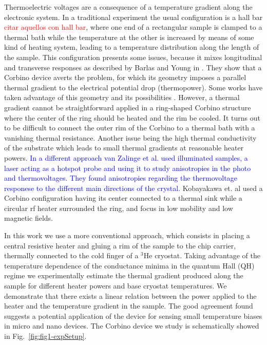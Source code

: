 Thermoelectric voltages are a consequence of a temperature gradient along the electronic system. 
In a traditional experiment the usual configuration is a hall bar \cite{chickering2010thermopower,chickering2013thermoelectric} \textcolor{red}{citar aquellos con hall bar}, where one end of a rectangular sample is clamped to a thermal bath while the temperature at the other is increased by means of some kind of heating system, leading to a temperature distribution along the length of the sample. This configuration presents some issues, because it mixes longitudinal and transverse responses as described by Barlas and Young in \cite{barlas2012thermopower}. They show that a Corbino device averts the problem, for which its geometry imposes a parallel thermal gradient to the electrical potential drop (thermopower). Some works have taken advantage of this geometry and its possibilities \cite{Zalinge2003,kobayakawa2013diffusion,real2020thermoelectricity,mateos2021thermoelectric}. 
However, a thermal gradient cannot be straightforward applied in a ring-shaped Corbino structure where the center of the ring should be heated and the rim be cooled. 
It turns out to be difficult to connect the outer rim of the Corbino to a thermal bath with a vanishing thermal resistance. 
Another issue being the high thermal conductivity of the substrate which leads to small thermal gradients at reasonable heater powers. \textcolor{blue}{In a different approach van Zalinge et al. \cite{Zalinge2003} used illuminated samples, a laser acting as a hotspot probe and using it to study anisotropies in the photo and thermovoltages. They found anisotropies regarding the thermovoltage responese to the different main directions of the crystal.} Kobayakawa et. al\cite{kobayakawa2013diffusion} used a Corbino configuration having its center connected to a thermal sink while a circular rf heater surrounded the ring, and focus in low mobility and low magnetic fields. 

In this work we use a more conventional approach, which consists in placing  a central resistive heater and gluing a rim of the sample to the chip carrier, thermally connected to the cold finger of a $^3$He cryostat. Taking advantage of the temperature dependence of the conductance minima in the quantum Hall (QH) regime we experimentally estimate the thermal gradient produced along the sample for different heater powers and base cryostat temperatures. We demonstrate that there exists a linear relation between the power applied to the heater and the temperature gradient in the sample. The good agreement found suggests a potential application of the device for sensing small temperature biases in micro and nano devices. The Corbino device we study is schematically showed in Fig.~\ref{fig:fig1-expSetup}.